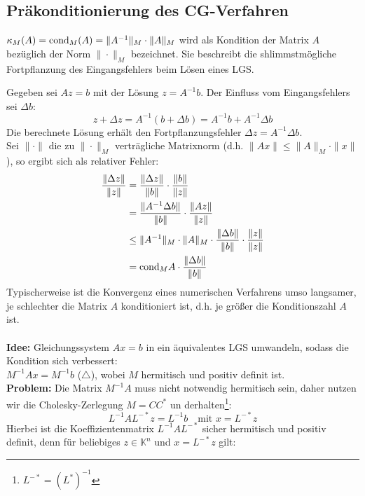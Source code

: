 \documentclass{article}
\begin{document}
    \subsection{Präkonditionierung des CG-Verfahren}
    \begin{defbox}
        $\kappa_M(A) = \text{cond}_M(A) = \|A^{-1}\|_M\cdot \|A\|_M$ wird als Kondition der Matrix $A$ bezüglich 
        der Norm $\|\cdot\|_M$ bezeichnet. 
        Sie beschreibt die shlimmstmögliche Fortpflanzung des Eingangsfehlers beim Lösen eines LGS.
    \end{defbox}
    Gegeben sei $Az=b$ mit der Lösung $z=A^{-1}b$. Der Einfluss vom Eingangsfehlers sei $\Delta b$:
    \[z + \Delta z = A^{-1}(b+\Delta b) = A^{-1}b + A^{-1}\Delta b\]
    Die berechnete Lösung erhält den Fortpflanzungsfehler $\Delta z = A^{-1}\Delta b$. \\ 
    Sei $\|\cdot\|$ die zu $\|\cdot\|_M$ verträgliche Matrixnorm (d.h. $\|Ax\|\leq \|A\|_M\cdot\|x\|$), 
    so ergibt sich als relativer Fehler:
    \begin{align*}
        \dfrac{\|\Delta z\|}{\|z\|} &= \dfrac{\|\Delta z\|}{\|b\|} \cdot\dfrac{\|b\|}{\|z\|} \\
        &= \dfrac{\|A^{-1}\Delta b\|}{\|b\|} \cdot\dfrac{\|Az\|}{\|z\|} \\
        &\leq \|A^{-1}\|_M\cdot\|A\|_M\cdot\dfrac{\|\Delta b\|}{\|b\|}\cdot\dfrac{\|z\|}{\|z\|} \\
        &= \text{cond}_M{A}\cdot\dfrac{\|\Delta b\|}{\|b\|} \\
    \end{align*}
    Typischerweise ist die Konvergenz eines numerischen Verfahrens umso langsamer, je schlechter die Matrix $A$ 
    konditioniert ist, d.h. je größer die Konditionszahl $A$ ist. \\ \\
    \textbf{Idee:} Gleichungssystem $Ax=b$ in ein äquivalentes LGS umwandeln, sodass die Kondition sich verbessert:\\
    $M^{-1}Ax = M^{-1}b$ ({\scriptsize$\triangle$}), wobei $M$ hermitisch und positiv definit ist. \\
    \textbf{Problem:} Die Matrix $M^{-1}A$ muss nicht notwendig hermitisch sein, daher nutzen wir die 
    Cholesky-Zerlegung $M=CC^*$
    un derhalten\footnote{$L^{-*} = (L^*)^{-1}$}: 
    \[L^{-1}AL^{-*}z = L^{-1}b \quad \text{mit } x = L^{-*}z\]
    Hierbei ist die Koeffizientenmatrix $L^{-1}AL^{-*}$ sicher hermitisch und positiv definit, 
    denn für beliebiges $z\in\mathbb{K}^n$ und $x=L^{-*}z$ gilt: 
\end{document}
